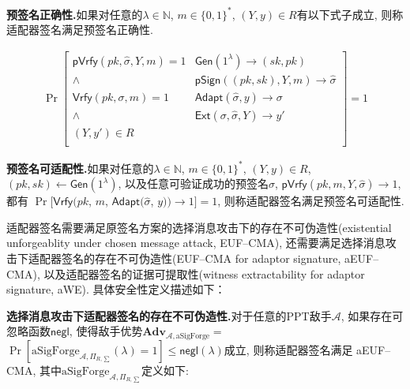 \documentclass[review]{jcr}
\begin{document}
\begin{trivlist}
\item \textbf{预签名正确性.}如果对任意的$\lambda\in \mathbb{N}$, $m\in\{0,1\}^*$, $(Y,y)\in R$有以下式子成立, 则称适配器签名满足预签名正确性.

\begin{equation*}
\begin{aligned}
\Pr\left[
\begin{array}{c|c}
\mathsf{pVrfy}(pk,\hat{\sigma},Y,m)= 1 & \mathsf{Gen}(1^\lambda)\rightarrow (sk,pk)\\
\wedge & \mathsf{pSign}((pk,sk),Y,m)\rightarrow \hat{\sigma} \\               
\mathsf{Vrfy}(pk,\sigma,m)= 1  & \mathsf{Adapt}(\hat{\sigma},y)\rightarrow \sigma \\
\wedge  & \mathsf{Ext}(\sigma,\hat{\sigma},Y)\rightarrow y' \\
(Y,y')\in R & \\
\end{array}
\right]=1
\end{aligned}
\end{equation*}

\end{trivlist}

\begin{trivlist}
\item \textbf{预签名可适配性.}如果对任意的$\lambda\in \mathbb{N}$, $m\in\{0,1\}^*$, $(Y,y)\in R$, $(pk,sk)\leftarrow \mathsf{Gen}(1^\lambda)$, 以及任意可验证成功的预签名$\hat{\sigma}$, $\mathsf{pVrfy}(pk,m,Y,\hat{\sigma})\rightarrow 1$, 都有 $\Pr[\mathsf{Vrfy}(pk$, $m$, $\mathsf{Adapt}(\hat{\sigma}$, $y))\rightarrow 1] = 1$, 则称适配器签名满足预签名可适配性. 
\end{trivlist}

适配器签名需要满足原签名方案的选择消息攻击下的存在不可伪造性(existential unforgeablity under chosen message attack, EUF–CMA), 还需要满足选择消息攻击下适配器签名的存在不可伪造性(EUF–CMA for adaptor signature, aEUF–CMA), 以及适配器签名的证据可提取性(witness extractability for adaptor signature, aWE). 具体安全性定义描述如下：

\begin{trivlist}
\item \textbf{选择消息攻击下适配器签名的存在不可伪造性.}对于任意的PPT敌手$\mathcal{A}$, 如果存在可忽略函数$\mathsf{negl}$, 使得敌手优势$\textbf{Adv}_{\mathcal{A},\text{aSigForge}}=$$\Pr[\text{aSigForge}_{\mathcal{A},\Pi_{R,\sum}}(\lambda) = 1] \leq \mathsf{negl}(\lambda)$成立, 则称适配器签名满足
aEUF–CMA, 其中$\text{aSigForge}_{\mathcal{A},\Pi_{R,\sum}}$定义如下: 
\end{trivlist}
\end{document}
